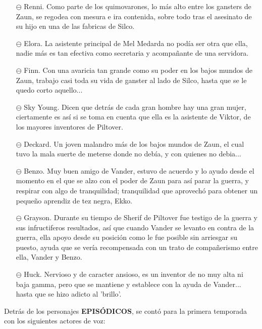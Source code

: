 \documentclass[11pt,a5paper]{article}
\begin{document}
\begin{itemize}
    \item[$\ominus$] Renni. Como parte de los quimovarones, lo más alto entre los gansters de Zaun, se regodea con mesura e ira contenida, sobre todo tras el asesinato de su hijo en una de las fabricas de Silco.
    \item[$\ominus$] Elora. La asistente principal de Mel Medarda no podía ser otra que ella, nadie más es tan efectiva como secretaria y acompañante de una servidora.
    \item[$\ominus$] Finn. Con una avaricia tan grande como su poder en los bajos mundos de Zaun, trabajo casi toda su vida de ganster al lado de Silco, hasta que se le quedo corto aquello...
    \item[$\ominus$] Sky Young. Dicen que detrás de cada gran hombre hay una gran mujer, ciertamente es así si se toma en cuenta que ella es la asistente de Viktor, de los mayores inventores de Piltover.
    \item[$\ominus$] Deckard. Un joven malandro más de los bajos mundos de Zaun, el cual tuvo la mala suerte de meterse donde no debía, y con quienes no debia...
    \item[$\ominus$] Benzo. Muy buen amigo de Vander, estuvo de acuerdo y lo ayudo desde el momento en el que se alzo con el poder de Zaun para así parar la guerra, y respirar con algo de tranquilidad; tranquilidad que aprovechó para obtener un pequeño aprendiz de tez negra, Ekko.
    \item[$\ominus$] Grayson. Durante su tiempo de Sherif de Piltover fue testigo de la guerra y sus infructiferos resultados, así que cuando Vander se levanto en contra de la guerra, ella apoyo desde su posición como le fue posible sin arriesgar su puesto, ayuda que se vería recompensada con un trato de compañerismo entre ella, Vander y Benzo.
    \item[$\ominus$] Huck. Nervioso y de caracter ansioso, es un inventor de no muy alta ni baja gamma, pero que se mantiene y establece con la ayuda de Vander... hasta que se hizo adicto al 'brillo'.
\end{itemize}

Detrás de los personajes {\textbf{EPISÓDICOS}}, se contó para la primera temporada con los siguientes actores de voz:
\end{document}
